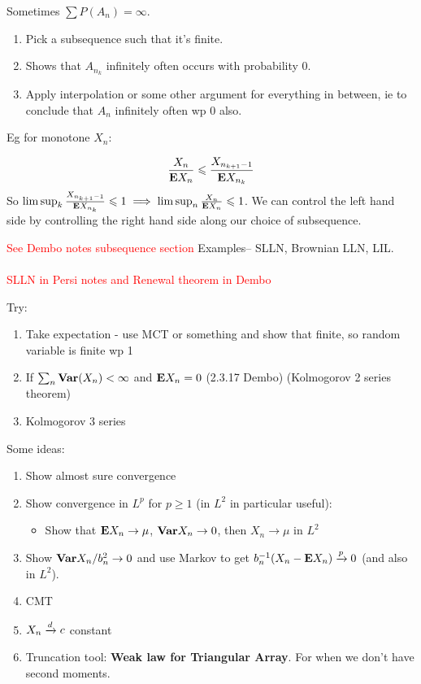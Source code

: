 \documentclass{article}
\newcommand\myworries[1]{\textcolor{red}{#1}}
\begin{document}
\begin{theorem}
Sometimes $\sum P(A_n) =\infty$. 
\begin{enumerate}
	\item Pick a subsequence such that it's finite. 
	\item Shows that $A_{n_k}$ infinitely often occurs with probability $0$.
	\item Apply interpolation or some other argument for everything in between, ie to conclude that $A_n$ infinitely often wp $0$ also. 
	
\end{enumerate}
Eg for monotone $X_n$:

$$ \frac{X_n}{\mathbf{E} X_n} \leqslant \frac{X_{n_{k+1} -1}}{\mathbf{E} X_{n_k}}$$
So $\limsup_k \frac{X_{n_{k+1} -1}}{\mathbf{E} X_{n_k}} \leqslant 1 \implies \limsup_n \frac{X_n}{\mathbf{E} X_n}\leqslant 1$. We can control the left hand side by controlling the right hand side along our choice of subsequence. 

\myworries{See Dembo notes subsequence section}
Examples-- SLLN, Brownian LLN, LIL. \\ \\

\myworries{SLLN in Persi notes and Renewal theorem in Dembo}

\end{theorem}

\begin{recipe}
Try:
\begin{enumerate}
	\item Take expectation - use MCT or something and show that finite, so random variable is finite wp 1
	\item If $\sum_n \mathbf{Var} (X_n) <\infty$ and $\mathbf{E} X_n = 0$ (2.3.17 Dembo) (Kolmogorov 2 series theorem)
	\item Kolmogorov 3 series
\end{enumerate}
\end{recipe}

\begin{recipe}

Some ideas:
\begin{enumerate}
	\item Show almost sure convergence
	\item Show convergence in $L^p$ for $p\geq 1$ (in $L^2$ in particular useful):
	\begin{itemize}
		\item Show that $\mathbf{E} X_n \to \mu$, $\mathbf{Var} X_n \to 0$, then $X_n \to \mu$ in $L^2$
	\end{itemize}
	\item Show $\mathbf{Var} X_n / b_n^2 \to 0$ and use Markov to get $b_n^{-1} (X_n - \mathbf{E} X_n)\xrightarrow{p} 0$ (and also in $L^2$).
	\item CMT 
	\item $X_n \xrightarrow{d} c$ constant
	\item Truncation tool: \textbf{Weak law for Triangular Array}. For when we don't have second moments. 
	\end{enumerate}
\end{recipe}
\end{document}
